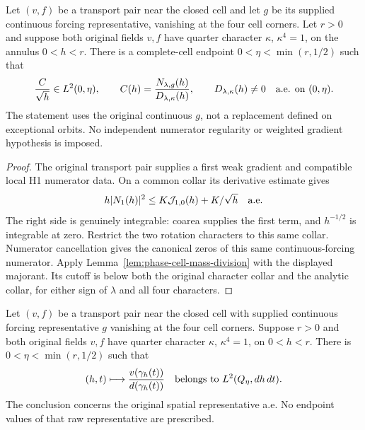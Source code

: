 \begin{lemma}
\label{lem:zero-saddle-quotient-mass}
\leanok
Let $(v,f)$ be a transport pair near the closed cell and let $g$ be
its supplied continuous forcing representative, vanishing at the four
cell corners. Let $r>0$ and suppose both original fields $v,f$ have
quarter character $\kappa$, $\kappa^4=1$, on the annulus $0<h<r$.
There is a complete-cell endpoint $0<\eta<\min(r,1/2)$ such that
\[
 \frac{C}{\sqrt h}\in L^2(0,\eta),\qquad
 C(h)=\frac{N_{\lambda,g}(h)}{D_{\lambda,\kappa}(h)},
 \qquad D_{\lambda,\kappa}(h)\ne0\quad\hbox{a.e. on }(0,\eta).
\]
The statement uses the original continuous $g$, not a replacement
defined on exceptional orbits. No independent numerator regularity or
weighted gradient hypothesis is imposed.
\end{lemma}

\begin{proof}
\leanok
The original transport pair supplies a first weak gradient and compatible
local H1 numerator data. On a common collar its derivative estimate gives
\[
 h|N_1(h)|^2\le K\mathcal J_{1,0}(h)+K/\sqrt h
 \quad\hbox{a.e.}
\]
The right side is genuinely integrable: coarea supplies the first
term, and $h^{-1/2}$ is integrable at zero.
Restrict the two rotation characters to this same collar.
Numerator cancellation gives the canonical zeros of this same
continuous-forcing numerator.
Apply Lemma~\ref{lem:phase-cell-mass-division} with the displayed
majorant. Its cutoff is below both the original character collar and
the analytic collar, for either sign of $\lambda$ and all four characters.
\end{proof}

\begin{lemma}
\label{lem:zero-saddle-quarter-mass}
\leanok
Let $(v,f)$ be a transport pair near the closed cell with supplied continuous
forcing representative $g$ vanishing at the four cell corners.
Suppose $r>0$ and both original fields $v,f$ have quarter character
$\kappa$, $\kappa^4=1$, on $0<h<r$.
There is $0<\eta<\min(r,1/2)$ such that
\[
 (h,t)\longmapsto
 \frac{v(\gamma_h(t))}{d(\gamma_h(t))}
 \quad\hbox{belongs to }L^2(Q_\eta,dh\,dt).
\]
The conclusion concerns the original spatial representative a.e.
No endpoint values of that raw representative are prescribed.
\end{lemma}

